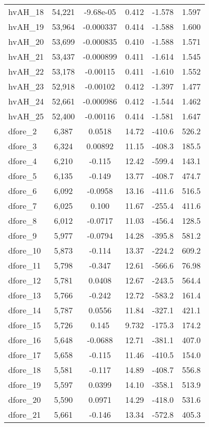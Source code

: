 \begin{tabular}{lccccc}
hvAH\_18 & 54,221 & -9.68e-05 & 0.412 & -1.578 & 1.597 \\
hvAH\_19 & 53,964 & -0.000337 & 0.414 & -1.588 & 1.600 \\
hvAH\_20 & 53,699 & -0.000835 & 0.410 & -1.588 & 1.571 \\
hvAH\_21 & 53,437 & -0.000899 & 0.411 & -1.614 & 1.545 \\
hvAH\_22 & 53,178 & -0.00115 & 0.411 & -1.610 & 1.552 \\
hvAH\_23 & 52,918 & -0.00102 & 0.412 & -1.397 & 1.477 \\
hvAH\_24 & 52,661 & -0.000986 & 0.412 & -1.544 & 1.462 \\
hvAH\_25 & 52,400 & -0.00116 & 0.414 & -1.581 & 1.647 \\
dfore\_2 & 6,387 & 0.0518 & 14.72 & -410.6 & 526.2 \\
dfore\_3 & 6,324 & 0.00892 & 11.15 & -408.3 & 185.5 \\
dfore\_4 & 6,210 & -0.115 & 12.42 & -599.4 & 143.1 \\
dfore\_5 & 6,135 & -0.149 & 13.77 & -408.7 & 474.7 \\
dfore\_6 & 6,092 & -0.0958 & 13.16 & -411.6 & 516.5 \\
dfore\_7 & 6,025 & 0.100 & 11.67 & -255.4 & 411.6 \\
dfore\_8 & 6,012 & -0.0717 & 11.03 & -456.4 & 128.5 \\
dfore\_9 & 5,977 & -0.0794 & 14.28 & -395.8 & 581.2 \\
dfore\_10 & 5,873 & -0.114 & 13.37 & -224.2 & 609.2 \\
dfore\_11 & 5,798 & -0.347 & 12.61 & -566.6 & 76.98 \\
dfore\_12 & 5,781 & 0.0408 & 12.67 & -243.5 & 564.4 \\
dfore\_13 & 5,766 & -0.242 & 12.72 & -583.2 & 161.4 \\
dfore\_14 & 5,787 & 0.0556 & 11.84 & -327.1 & 421.1 \\
dfore\_15 & 5,726 & 0.145 & 9.732 & -175.3 & 174.2 \\
dfore\_16 & 5,648 & -0.0688 & 12.71 & -381.1 & 407.0 \\
dfore\_17 & 5,658 & -0.115 & 11.46 & -410.5 & 154.0 \\
dfore\_18 & 5,581 & -0.117 & 14.89 & -408.7 & 556.8 \\
dfore\_19 & 5,597 & 0.0399 & 14.10 & -358.1 & 513.9 \\
dfore\_20 & 5,590 & 0.0971 & 14.29 & -418.0 & 531.6 \\
dfore\_21 & 5,661 & -0.146 & 13.34 & -572.8 & 405.3 \\

\end{tabular}

